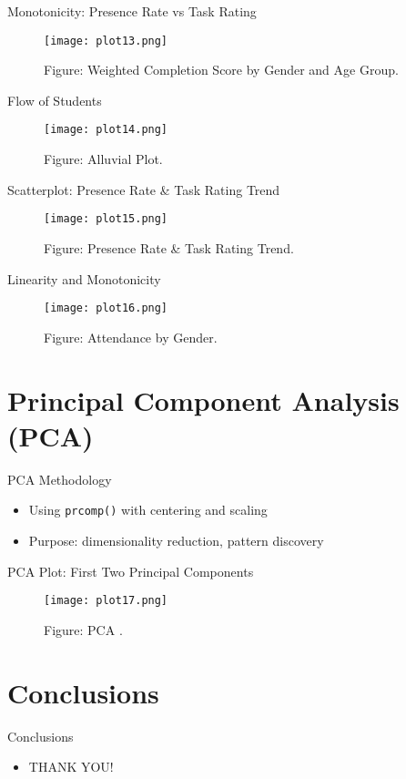 \documentclass[11pt]{beamer}
\begin{document}
\begin{frame}{Monotonicity: Presence Rate vs Task Rating}
    \begin{figure}
    \centering
    \texttt{[image: plot13.png]}
    \caption{Figure: Weighted Completion Score by Gender and Age Group.}
    \end{figure}\end{frame}

\begin{frame}{Flow of Students}
    \begin{figure}
    \centering
    \texttt{[image: plot14.png]}
    \caption{Figure: Alluvial Plot.}
    \end{figure}\end{frame}

\begin{frame}{Scatterplot: Presence Rate \& Task Rating Trend}
    \begin{figure}
    \centering
    \texttt{[image: plot15.png]}
    \caption{Figure: Presence Rate \& Task Rating Trend.}
    \end{figure}
\end{frame}

\begin{frame}{Linearity and Monotonicity}
    \begin{figure}
    \centering
    \texttt{[image: plot16.png]}
    \caption{Figure: Attendance by Gender.}
    \end{figure}
\end{frame}


\section{Principal Component Analysis (PCA)}
\begin{frame}{PCA Methodology}
  \begin{itemize}
    \item Using \texttt{prcomp()} with centering and scaling
    \item Purpose: dimensionality reduction, pattern discovery
  \end{itemize}
\end{frame}

\begin{frame}{PCA Plot: First Two Principal Components}
    \begin{figure}
    \centering
    \texttt{[image: plot17.png]}
    \caption{Figure: PCA
    .}
    \end{figure}\end{frame}

\section{Conclusions}
\begin{frame}{Conclusions}
  \begin{itemize}
    \item THANK YOU!
  \end{itemize}
\end{frame}
\end{document}
